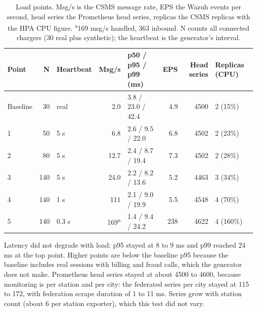 \documentclass[a4paper,11pt]{article}
\numberwithin{table}{section}
\begin{document}
\begin{table}[tb]
\centering
\footnotesize
\setlength{\tabcolsep}{4pt}
\begin{tabularx}{\textwidth}{@{}lrlrXrrl@{}}
\toprule
Point & N & Heartbeat & Msg/s & p50 / p95 / p99 (ms) & EPS & Head series & Replicas (CPU) \\
\midrule
Baseline & 30  & real  & 2.0 & 3.8 / 23.0 / 42.4 & 4.9 & 4500 & 2 (15\%) \\
1        & 50  & 5 s   & 6.8 & 2.6 / 9.5 / 22.0 & 6.8 & 4502 & 2 (23\%) \\
2        & 80  & 5 s   & 12.7 & 2.4 / 8.7 / 19.4 & 7.3 & 4502 & 2 (28\%) \\
3        & 140 & 5 s   & 24.0 & 2.2 / 8.2 / 13.6 & 5.2 & 4463 & 3 (34\%) \\
4        & 140 & 1 s   & 111 & 2.1 / 9.0 / 19.9 & 5.5 & 4548 & 4 (70\%) \\
5        & 140 & 0.3 s & 169\textsuperscript{a} & 1.4 / 9.4 / 24.2 & 238 & 4622 & 4 (160\%) \\
\bottomrule
\end{tabularx}
\caption{Load points. Msg/s is the CSMS message rate, EPS the Wazuh events per second, head series the Prometheus head series, replicas the CSMS replicas with the HPA CPU figure. \textsuperscript{a}169 msg/s handled, 363 inbound. N counts all connected chargers (30 real plus synthetic); the heartbeat is the generator's interval.}
\label{tab:load}
\end{table}

Latency did not degrade with load: p95 stayed at 8 to 9 ms and p99 reached 24 ms at the top point. Higher points are below the baseline p95 because the baseline includes real sessions with billing and fraud calls, which the generator does not make. Prometheus head series stayed at about 4500 to 4600, because monitoring is per station and per city: the federated series per city stayed at 115 to 172, with federation scrape duration of 1 to 11 ms. Series grow with station count (about 6 per station exporter), which this test did not vary.
\end{document}
